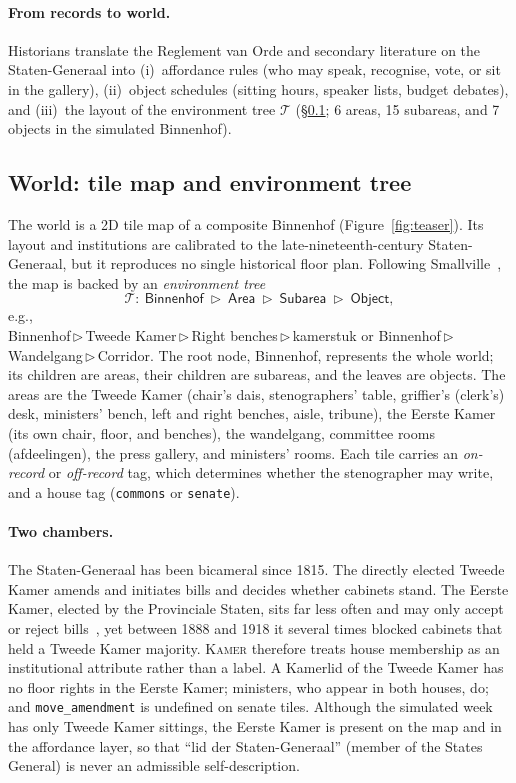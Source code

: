 \documentclass[sigconf,review,anonymous]{acmart}
\newcommand{\sys}{\textsc{Kamer}}
\begin{document}
\paragraph{From records to world.} Historians translate the Reglement van
Orde and secondary literature on the Staten-Generaal into
(i)~affordance rules (who may speak, recognise, vote, or sit in the
gallery), (ii)~object schedules (sitting hours, speaker lists, budget
debates), and (iii)~the layout of the environment tree $\mathcal{T}$
(\S\ref{sec:world}; 6 areas, 15 subareas, and 7 objects in the simulated
Binnenhof).

\subsection{World: tile map and environment tree}
\label{sec:world}

The world is a 2D tile map of a composite Binnenhof
(Figure~\ref{fig:teaser}). Its layout and institutions are calibrated to
the late-nineteenth-century Staten-Generaal, but it reproduces no single
historical floor plan. Following Smallville~\cite{park2023generative}, the
map is backed by an \emph{environment tree}
\[
\mathcal{T}:\ \textsf{Binnenhof}\ \triangleright\ \textsf{Area}\ \triangleright\
\textsf{Subarea}\ \triangleright\ \textsf{Object},
\]
e.g.,\\ \textsf{Binnenhof\,$\triangleright$\,Tweede Kamer\,$\triangleright$\,Right benches\,$\triangleright$\,kamerstuk}
or
\textsf{Binnenhof\,$\triangleright$\,Wandelgang\,$\triangleright$\,Corridor}.
The root node, Binnenhof, represents the whole world; its children are
areas, their children are subareas, and the leaves are objects. The areas
are the Tweede Kamer (chair's dais, stenographers' table,
griffier's (clerk's) desk, ministers' bench, left and right benches, aisle,
tribune), the Eerste Kamer (its own chair, floor, and benches), the
wandelgang, committee rooms (afdeelingen), the press gallery, and ministers'
rooms. Each tile carries an \emph{on-record} or \emph{off-record} tag,
which determines whether the stenographer may write, and a house tag
(\texttt{commons} or \texttt{senate}).

\paragraph{Two chambers.} The Staten-Generaal has been bicameral since 1815.
The directly elected Tweede Kamer amends and initiates bills and decides
whether cabinets stand. The Eerste Kamer, elected by the Provinciale
Staten, sits far less often and may only accept or reject
bills~\cite{pdc2024kamers}, yet between 1888 and 1918 it several times
blocked cabinets that held a Tweede Kamer majority. \sys{} therefore treats house membership as
an institutional attribute rather than a label. A Kamerlid of the Tweede
Kamer has no floor rights in the Eerste Kamer; ministers, who appear in
both houses, do; and \texttt{move\_amendment} is undefined on senate tiles.
Although the simulated week has only Tweede Kamer sittings, the Eerste Kamer is present on the map
and in the affordance layer, so that ``lid der Staten-Generaal'' (member of
the States General) is never an admissible self-description.
\end{document}
